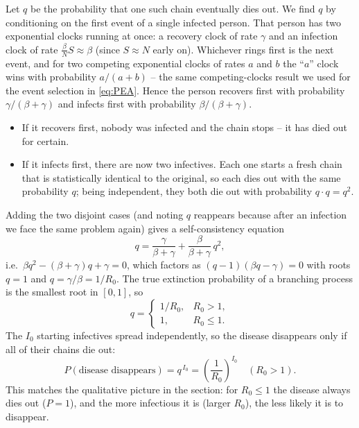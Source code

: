 Let $q$ be the probability that one such chain eventually dies out. We find $q$
by conditioning on the first event of a single infected person. That
person has two exponential clocks running at once: a recovery clock of rate
$\gamma$ and an infection clock of rate $\tfrac{\beta}{N}S\approx\beta$ (since
$S\approx N$ early on). Whichever rings first is the next event, and for two
competing exponential clocks of rates $a$ and $b$ the ``$a$'' clock wins with
probability $a/(a+b)$ -- the same competing-clocks result we used for the event
selection in \autoref{eq:PEA}. Hence the person recovers first with probability
$\gamma/(\beta+\gamma)$ and infects first with probability $\beta/(\beta+\gamma)$.
\begin{itemize}
  \item If it recovers first, nobody was infected and the chain stops --
        it has died out for certain.
  \item If it infects first, there are now two infectives. Each one
        starts a fresh chain that is statistically identical to the original, so
        each dies out with the same probability $q$; being independent, they
        both die out with probability $q\cdot q=q^2$.
\end{itemize}
Adding the two disjoint cases (and noting $q$ reappears because after an
infection we face the same problem again) gives a self-consistency equation
\begin{equation}
  q = \frac{\gamma}{\beta+\gamma} + \frac{\beta}{\beta+\gamma}\,q^2,
  \label{eq:qfix}
\end{equation}
i.e.\ $\beta q^2 - (\beta+\gamma)q + \gamma = 0$, which factors as
$(q-1)(\beta q-\gamma)=0$ with roots $q=1$ and $q=\gamma/\beta=1/R_0$. The true
extinction probability of a branching process is the smallest root in
$[0,1]$, so
\begin{equation}
  q =
  \begin{cases}
    1/R_0, & R_0 > 1,\\
    1,     & R_0 \le 1.
  \end{cases}
  \label{eq:q}
\end{equation}
The $I_0$ starting infectives spread independently, so the disease disappears
only if all of their chains die out:
\begin{equation}
  P(\text{disease disappears}) = q^{\,I_0} = \left(\frac{1}{R_0}\right)^{I_0}
  \quad (R_0 > 1).
  \label{eq:pdisappear}
\end{equation}
This matches the qualitative picture in the  section: for $R_0 \le 1$ the
disease always dies out ($P=1$), and the more infectious it is (larger $R_0$),
the less likely it is to disappear.

